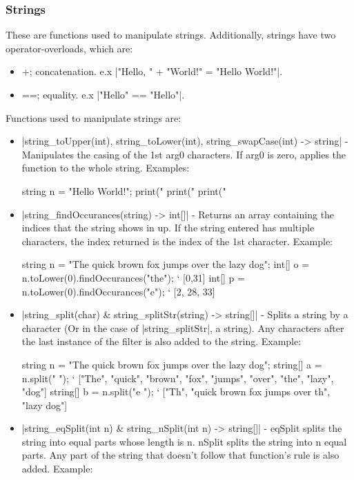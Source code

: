 \documentclass[12pt, letterpaper, oneside]{article}
\begin{document}
	\subsubsection{Strings}
	These are functions used to manipulate strings. Additionally, strings have two operator-overloads, which are:
	\begin{itemize}
		\item[--] +; concatenation. e.x \spverb|"Hello, " + "World!" = "Hello World!"|.
		\item[--] ==; equality. e.x \spverb|"Hello" == "Hello"|.
	\end{itemize}
	Functions used to manipulate strings are:
	\begin{itemize}
		\item[--] \spverb|string_toUpper(int), string_toLower(int), string_swapCase(int) -> string| - Manipulates the casing of the 1st arg0 characters. If arg0 is zero, applies the function to the whole string. Examples:
		
		\begin{spverbatim}
			string n = "Hello World!";
			print("\n%
			print("\n%
			print("\n%
		\end{spverbatim}
		\item[--] \spverb|string_findOccurances(string) -> int[]| - Returns an array \newline containing the indices that the string shows in up. If the string entered has multiple characters, the index returned is the index of the 1st character. Example:
		
		
		\begin{spverbatim}
			string n = "The quick brown fox jumps over the lazy dog";
			int[] o = n.toLower(0).findOccurances("the"); ` [0,31]
			int[] p = n.toLower(0).findOccurances("e"); ` [2, 28, 33]
		\end{spverbatim}
		\item[--] \spverb|string_split(char) & string_splitStr(string) -> string[]| - Splits a string by a character (Or in the case of \spverb|string_splitStr|, a string). Any characters after the last instance of the filter is also added to the string. Example:
		
		\begin{spverbatim}
			string n = "The quick brown fox jumps over the lazy dog";
			string[] a = n.split(" "); ` ["The", "quick", "brown", "fox", "jumps", "over", "the", "lazy", "dog"]
			string[] b = n.split("e "); ` ["Th", "quick brown fox jumps over th", "lazy dog"]
		\end{spverbatim}
		\item[--] \spverb|string_eqSplit(int n) & string_nSplit(int n) -> string[]| - \newline eqSplit splits the string into equal parts whose length is n. nSplit splits the string into n equal parts. Any part of the string that doesn't follow that function's rule is also added. Example:
		

\end{itemize}
\end{document}
